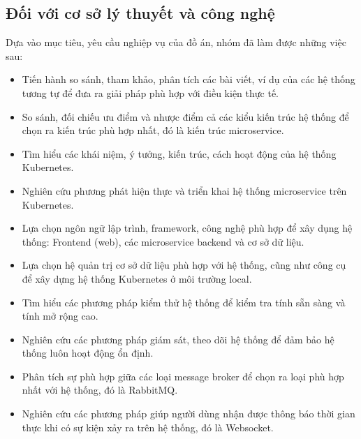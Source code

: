 \subsection{Đối với cơ sở lý thuyết và công nghệ}
\noindent Dựa vào mục tiêu, yêu cầu nghiệp vụ của đồ án, nhóm đã làm được những việc sau:
\begin{itemize}
    \item Tiến hành so sánh, tham khảo, phân tích các bài viết, ví dụ của các hệ thống tương tự để đưa ra giải pháp phù hợp với điều kiện thực tế.
    \item So sánh, đối chiếu ưu điểm và nhược điểm cả các kiểu kiến trúc hệ thống để chọn ra kiến trúc phù hợp nhất, đó là kiến trúc microservice.
    \item Tìm hiểu các khái niệm, ý tưởng, kiến trúc, cách hoạt động của hệ thống Kubernetes.
    \item Nghiên cứu phương phát hiện thực và triển khai hệ thống microservice trên Kubernetes.
    \item Lựa chọn ngôn ngữ lập trình, framework, công nghệ phù hợp để xây dụng hệ thống: Frontend (web), các microservice backend và cơ sở dữ liệu.
    \item Lựa chọn hệ quản trị cơ sở dữ liệu phù hợp với hệ thống, cũng như công cụ để xây dựng hệ thống Kubernetes ở môi trường local.
    \item Tìm hiểu các phương pháp kiểm thử hệ thống để kiểm tra tính sẵn sàng và tính mở rộng cao.
    \item Nghiên cứu các phương pháp giám sát, theo dõi hệ thống để đảm bảo hệ thống luôn hoạt động ổn định.
    \item Phân tích sự phù hợp giữa các loại message broker để chọn ra loại phù hợp nhất với hệ thống, đó là RabbitMQ.
    \item Nghiên cứu các phương pháp giúp người dùng nhận được thông báo thời gian thực khi có sự kiện xảy ra trên hệ thống, đó là Websocket.
\end{itemize}
